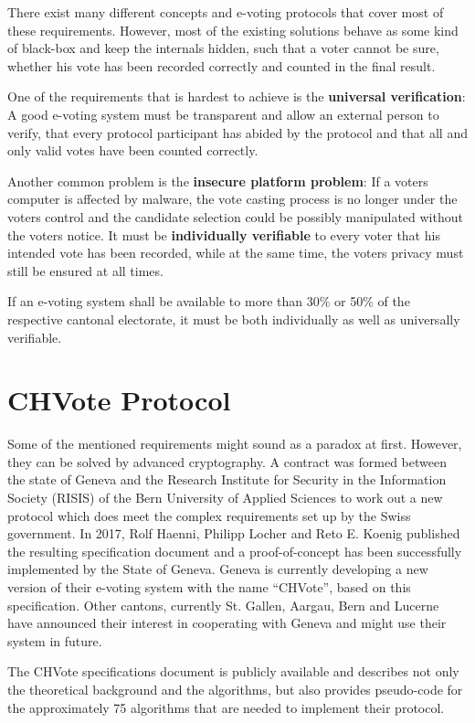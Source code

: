 There exist many different concepts and e-voting protocols that cover most of these requirements. However, most of the existing solutions behave as some kind of black-box and keep the internals hidden, such that a voter cannot be sure, whether his vote has been recorded correctly and counted in the final result.

One of the requirements that is hardest to achieve is the \textbf{universal verification}: A good e-voting system must be transparent and allow an external person to verify, that every protocol participant has abided by the protocol and that all and only valid votes have been counted correctly.

Another common problem is the \textbf{insecure platform problem}: If a voters computer is affected by malware, the vote casting process is no longer under the voters control and the candidate selection could be possibly manipulated without the voters notice. It must be \textbf{individually verifiable} to every voter that his intended vote has been recorded, while at the same time, the voters privacy must still be ensured at all times.

If an e-voting system shall be available to more than 30\% or 50\% of the respective cantonal electorate, it must be both individually as well as universally verifiable.

\section{CHVote Protocol}
Some of the mentioned requirements might sound as a paradox at first. However, they can be solved by advanced cryptography. A contract was formed between the state of Geneva and the  Research Institute for Security in the Information Society (RISIS) of the Bern University of Applied Sciences to work out a new protocol which does meet the complex requirements set up by the Swiss government. In 2017, Rolf Haenni, Philipp Locher and Reto E. Koenig published the resulting specification document and a proof-of-concept has been successfully implemented by the State of Geneva. Geneva is currently developing a new version of their e-voting system with the name "`CHVote"', based on this specification. Other cantons, currently St. Gallen, Aargau, Bern and Lucerne have announced their interest in cooperating with Geneva and might use their system in future.

The CHVote specifications document is publicly available and describes not only the theoretical background and the algorithms, but also provides pseudo-code for the approximately 75 algorithms that are needed to implement their protocol.

